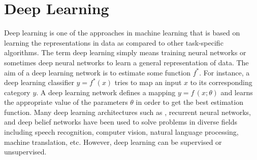 \documentclass[master]{thesis-uestc}
\begin{document}

\section{Deep Learning}
Deep learning is one of the approaches in machine learning that is based on learning the representations in data as compared to other task-specific algorithms. The term deep learning simply means training neural networks or sometimes deep neural networks to learn a general representation of data. The aim of a deep learning network is to estimate some function $f^*$. For instance, a deep learning classifier $y = f^*(x)$ tries to map an input $x$ to its corresponding category $y$. A deep learning network defines a mapping $y = f\,(x;\theta)$ and learns the appropriate value of the parameters $\theta$ in order to get the best estimation function. Many deep learning architectures such as \cite{Ivanovsky-2017, Kri12, Chr14}, recurrent neural networks\cite{7914752, 7801769}, and deep belief networks\cite{7111524, 7539822} have been used to solve problems in diverse fields including speech recognition, computer vision, natural language processing, machine translation, etc. However, deep learning can be supervised or unsupervised.
\end{document}
